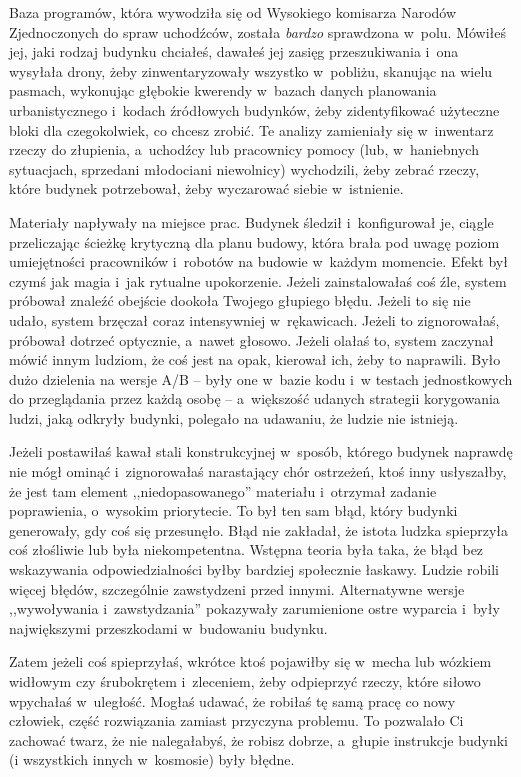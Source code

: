\documentclass[oneside,polish,11pt,sfheadings]{mwbk}
\begin{document}
Baza programów, która wywodziła się od Wysokiego komisarza Narodów
Zjednoczonych do spraw uchodźców, została \textit{bardzo} sprawdzona w~polu. Mówiłeś jej, jaki rodzaj budynku chciałeś, dawałeś jej zasięg
przeszukiwania i~ona wysyłała drony, żeby zinwentaryzowały wszystko w~pobliżu, skanując na wielu pasmach, wykonując głębokie kwerendy w~bazach
danych planowania urbanistycznego i~kodach źródłowych budynków, żeby
zidentyfikować użyteczne bloki dla czegokolwiek, co chcesz zrobić. Te
analizy zamieniały się w~inwentarz rzeczy do złupienia, a~uchodźcy lub
pracownicy pomocy (lub, w~haniebnych sytuacjach, sprzedani młodociani
niewolnicy) wychodzili, żeby zebrać rzeczy, które budynek potrzebował,
żeby wyczarować siebie w~istnienie.

Materiały napływały na miejsce prac. Budynek śledził i~konfigurował je,
ciągle przeliczając ścieżkę krytyczną dla planu budowy, która brała pod
uwagę poziom umiejętności pracowników i~robotów na budowie w~każdym
momencie. Efekt był czymś jak magia i~jak rytualne upokorzenie. Jeżeli
zainstalowałaś coś źle, system próbował znaleźć obejście dookoła Twojego
głupiego błędu. Jeżeli to się nie udało, system brzęczał coraz
intensywniej w~rękawicach. Jeżeli to zignorowałaś, próbował dotrzeć
optycznie, a~nawet głosowo. Jeżeli olałaś to, system zaczynał mówić
innym ludziom, że coś jest na opak, kierował ich, żeby to naprawili.
Było dużo dzielenia na wersje A/B -- były one w~bazie kodu i~w testach
jednostkowych do przeglądania przez każdą osobę -- a~większość udanych
strategii korygowania ludzi, jaką odkryły budynki, polegało na udawaniu,
że ludzie nie istnieją.

Jeżeli postawiłaś kawał stali konstrukcyjnej w~sposób, którego budynek
naprawdę nie mógł ominąć i~zignorowałaś narastający chór ostrzeżeń, ktoś
inny usłyszałby, że jest tam element ,,niedopasowanego'' materiału i~otrzymał zadanie poprawienia, o~wysokim priorytecie. To był ten sam
błąd, który budynki generowały, gdy coś się przesunęło. Błąd nie
zakładał, że istota ludzka spieprzyła coś złośliwie lub była
niekompetentna. Wstępna teoria była taka, że błąd bez wskazywania
odpowiedzialności byłby bardziej społecznie łaskawy. Ludzie robili
więcej błędów, szczególnie zawstydzeni przed innymi. Alternatywne wersje
,,wywoływania i~zawstydzania'' pokazywały zarumienione ostre wyparcia i~były największymi przeszkodami w~budowaniu budynku.

Zatem jeżeli coś spieprzyłaś, wkrótce ktoś pojawiłby się w~mecha lub
wózkiem widłowym czy śrubokrętem i~zleceniem, żeby odpieprzyć rzeczy,
które siłowo wpychałaś w~uległość. Mogłaś udawać, że robiłaś tę samą
pracę co nowy człowiek, część rozwiązania zamiast przyczyna problemu. To
pozwalało Ci zachować twarz, że nie nalegałabyś, że robisz dobrze, a~głupie instrukcje budynki (i wszystkich innych w~kosmosie) były błędne.
\end{document}
